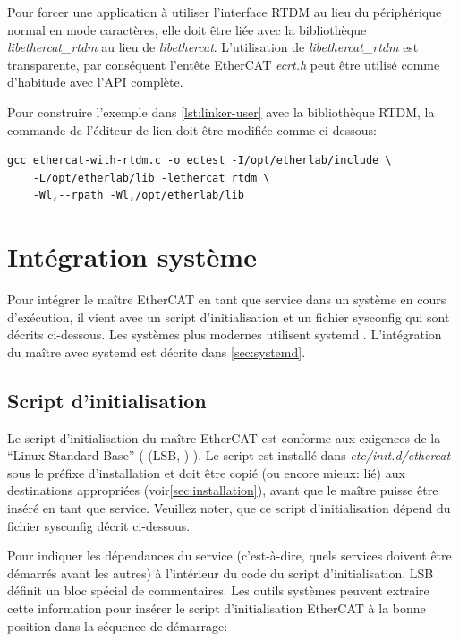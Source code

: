 \documentclass[a4paper,12pt,BCOR6mm,bibtotoc,idxtotoc]{scrbook}
\begin{document}
Pour forcer une application \`a utiliser l'interface RTDM au lieu du
p\'eriph\'erique normal en mode caract\`eres, elle doit \^etre li\'ee avec la
biblioth\`eque \textit{libethercat\_rtdm} au lieu de
\textit{libethercat}.  L'utilisation de \textit{libethercat\_rtdm} est
transparente, par cons\'equent l'ent\^ete EtherCAT \textit{ecrt.h} peut
\^etre utilis\'e comme d'habitude avec l'API compl\`ete.

Pour construire l'exemple dans \autoref{lst:linker-user} avec la
biblioth\`eque RTDM, la commande de l'\'editeur de lien doit \^etre modifi\'ee
comme ci-dessous:

\begin{lstlisting}
gcc ethercat-with-rtdm.c -o ectest -I/opt/etherlab/include \
    -L/opt/etherlab/lib -lethercat_rtdm \
    -Wl,--rpath -Wl,/opt/etherlab/lib
\end{lstlisting}


\section{Int\'egration syst\`eme}
\label{sec:system}

Pour int\'egrer le ma\^itre EtherCAT en tant que service dans un
syst\`eme en cours d'ex\'ecution, il vient avec un script
d'initialisation et un fichier sysconfig qui sont d\'ecrits
ci-dessous.  Les syst\`emes plus modernes utilisent systemd
\cite{systemd}.  L'int\'egration du ma\^itre avec systemd est
d\'ecrite dans \autoref{sec:systemd}.

\subsection{Script d'initialisation}
\label{sec:init}

Le script d'initialisation du ma\^itre EtherCAT est conforme aux
exigences de la ``Linux Standard Base'' ( (LSB, \cite{lsb})
).  Le script est install\'e dans \textit{etc/init.d/ethercat} sous le
pr\'efixe d'installation et doit \^etre copi\'e (ou encore mieux:
li\'e) aux destinations appropri\'ees
(voir\autoref{sec:installation}), avant que le ma\^itre puisse \^etre
ins\'er\'e en tant que service.  Veuillez noter, que ce script
d'initialisation d\'epend du fichier sysconfig d\'ecrit ci-dessous.

Pour indiquer les d\'ependances du service (c'est-\`a-dire, quels
services doivent \^etre d\'emarr\'es avant les autres) \`a
l'int\'erieur du code du script d'initialisation, LSB d\'efinit un
bloc sp\'ecial de commentaires.  Les outils syst\`emes peuvent
extraire cette information pour ins\'erer le script d'initialisation
EtherCAT \`a la bonne position dans la s\'equence de d\'emarrage:
\end{document}
